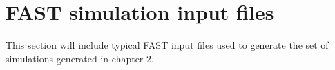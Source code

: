 
\chapter{FAST simulation input files} %

\label{AppendixA} %


This section will include typical FAST input files used to generate the set of simulations generated in chapter 2.